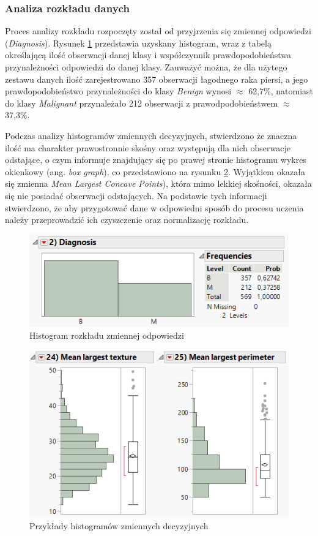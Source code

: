 	\subsubsection{Analiza rozkładu danych}
		
	Proces analizy rozkładu rozpoczęty został od przyjrzenia się zmiennej odpowiedzi (\textit{Diagnosis}). Rysunek \ref{fig:diagnosisdistribution} przedstawia uzyskany histogram, wraz z tabelą określającą ilość obserwacji danej klasy i współczynnik prawdopodobieństwa przynależności odpowiedzi do danej klasy. Zauważyć można, że dla użytego zestawu danych ilość zarejestrowano 357 obserwacji łagodnego raka piersi, a jego prawdopodobieństwo przynależności do klasy \textit{Benign} wynosi $\approx$ 62,7\%, natomiast do klasy \textit{Malignant} przynależało 212 obserwacji z prawodpodobieństwem $\approx$ 37,3\%.
		
	Podczas analizy histogramów zmiennych decyzyjnych, stwierdzono że znaczna ilość ma charakter prawostronnie skośny oraz występują dla nich obserwacje odstające, o czym informuje znajdujący się po prawej stronie histogramu wykres okienkowy (ang. \textit{box graph}), co przedstawiono na rysunku \ref{fig:variabledistribution}. Wyjątkiem okazała się zmienna \textit{Mean Largest Concave Points}), która mimo lekkiej skośności, okazała się nie posiadać obserwacji odstających. Na podstawie tych informacji stwierdzono, że aby przygotować dane w odpowiedni sposób do procesu uczenia należy przeprowadzić ich czyszczenie oraz normalizację rozkładu.
	
	\begin{figure}[!ht]
		\centering
		\includegraphics[width=0.6\linewidth]{Rysunki/Rozdzial2/diagnosis_distribution}
		\caption{Histogram rozkładu zmiennej odpowiedzi}
		\label{fig:diagnosisdistribution}
	\end{figure}
	
	\begin{figure}[!ht]
		\centering
		\includegraphics[width=0.6\linewidth]{Rysunki/Rozdzial2/variable_distribution}
		\caption{Przykłady histogramów zmiennych decyzyjnych}
		\label{fig:variabledistribution}
	\end{figure}
	
